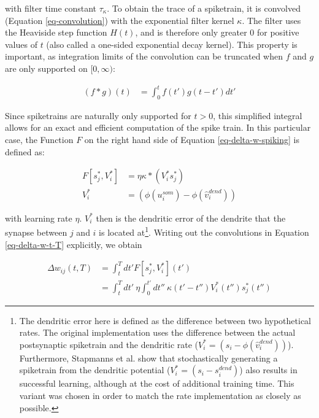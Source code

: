 with filter time constant $\tau_\kappa$. To obtain the trace of a spiketrain, it is convolved (Equation
\ref{eq-convolution}) with the exponential filter kernel $\kappa$. The filter uses the Heaviside step function $H(t)$,
and is therefore only greater $0$ for positive values of $t$ (also called a one-sided exponential decay kernel). This
property is important, as integration limits of the convolution can be truncated when $f$ and $g$ are only supported on
$[0,\infty)$:

\begin{align}
  (f \ast g)(t) & = \int_{0}^{t} f(t') g(t-t') d t'
\end{align}

Since spiketrains are naturally only supported for $t>0$, this simplified integral allows for an exact and efficient
computation of the spike train. In this particular case, the Function $F$ on the right hand side of Equation
\ref{eq-delta-w-spiking} is defined as:

\begin{align}
  F[s_j^\ast, V_i^\ast] & = \eta \kappa \ast (V_i^\ast s_j^\ast)        \\
  V_i^\ast              & = (\phi(u_i^{som}) - \phi(\hat{v}_i^{dend}) )
\end{align}

 with learning rate $\eta$.
$V_i^\ast$ then is the dendritic error of the dendrite that the synapse between $j$ and $i$ is located at\footnote{The
dendritic error here is defined as the difference between two hypothetical rates. The original implementation uses the
difference between the actual postsynaptic spiketrain and the dendritic rate ($V_i^\ast = (s_i - \phi(\hat{v}_i^{dend})
  )$). Furthermore, Stapmanns et al. show that stochastically generating a spiketrain from the dendritic potential
($V_i^\ast = (s_i - s_i^{dend})$) also results in successful learning, although at the cost of additional training time.
This variant was chosen in order to match the rate implementation as closely as possible.}. Writing out the convolutions
in Equation \ref{eq-delta-w-t-T} explicitly, we obtain

\begin{align}
  \Delta w_{ij}(t,T) & = \int_t^T dt' F[s_j^\ast, V_i^\ast](t')                                               \\
                     & =  \int_t^T dt' \  \eta\int_0^{t'} dt'' \ \kappa(t'-t'') V_i^\ast (t'') s_j^\ast (t'') \label{eq-delta-w-t-T-long}
\end{align}

